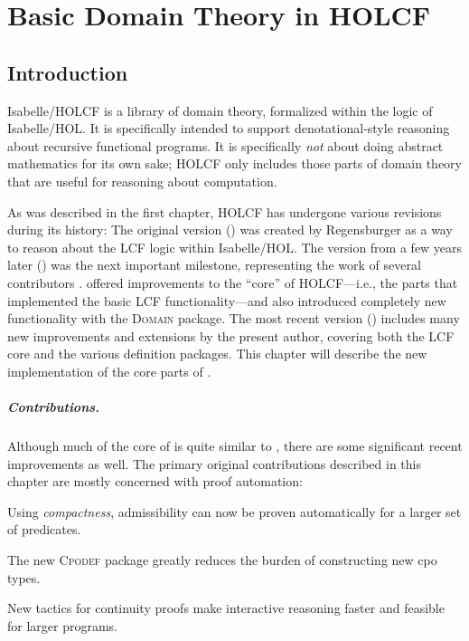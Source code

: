 \chapter{Basic Domain Theory in HOLCF}
\label{ch:holcf}


\section{Introduction}

Isabelle/HOLCF is a library of domain theory, formalized within the logic of Isabelle/HOL. It is specifically intended to support denotational-style reasoning about recursive functional programs. It is specifically \emph{not} about doing abstract mathematics for its own sake; HOLCF only includes those parts of domain theory that are useful for reasoning about computation.

As was described in the first chapter, HOLCF has undergone various revisions during its history: The original version () was created by Regensburger \cite{regensburger94thesis, regensburger95holcf} as a way to reason about the LCF logic \cite{paulson87lcf} within Isabelle/HOL. The version from a few years later () was the next important milestone, representing the work of several contributors \cite{hol+lcf}.  offered improvements to the ``core'' of HOLCF---i.e., the parts that implemented the basic LCF functionality---and also introduced completely new functionality with the \textsc{Domain} package. The most recent version () includes many new improvements and extensions by the present author, covering both the LCF core and the various definition packages. This chapter will describe the new implementation of the core parts of .

\paragraph{Contributions.} Although much of the core of  is quite similar to , there are some significant recent improvements as well. The primary original contributions described in this chapter are mostly concerned with proof automation:
\begin{itemize*}
\item Using \emph{compactness}, admissibility can now be proven automatically for a larger set of predicates.
\item The new \textsc{Cpodef} package greatly reduces the burden of constructing new cpo types.
\item New tactics for continuity proofs make interactive reasoning faster and feasible for larger programs.
\end{itemize*}

